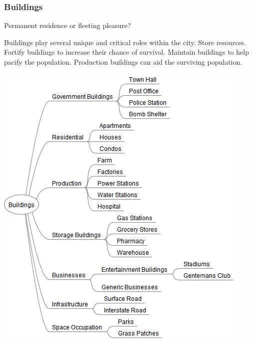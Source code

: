 \documentclass[ascpectratio=169]{beamer}
\begin{document}
\begin{frame}

  \frametitle{Buildings}

  \begin{center}
    {\large Permanent residence or fleeting pleasure?}
  \end{center}

  \begin{multicols}{2}

  \begin{outline}
    \1 Buildings play several unique and critical roles within the city.
    \1 Store resources.
    \1 Fortify buildings to increase their chance of survival.
    \1 Maintain buildings to help pacify the population.
    \1 Production buildings can aid the surviving population.
  \end{outline}

  \columnbreak

  \begin{center}
    \includegraphics[scale=0.34, trim=4cm 0 4.5cm 0]{../../Diagrams/Buildings/Buildings.png}
  \end{center}

  \end{multicols}

\end{frame}
\end{document}
